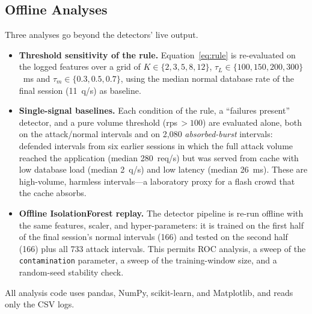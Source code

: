 \subsection{Offline Analyses}
Three analyses go beyond the detectors' live output.
\begin{itemize}[leftmargin=*]
\item \textbf{Threshold sensitivity of the rule.} Equation~\eqref{eq:rule} is
re-evaluated on the logged features over a grid of $K\in\{2,3,5,8,12\}$,
$\tau_L\in\{100,150,200,300\}$~ms and $\tau_m\in\{0.3,0.5,0.7\}$, using the median
normal database rate of the final session (11~q/s) as baseline.
\item \textbf{Single-signal baselines.} Each condition of the rule, a ``failures
present'' detector, and a pure volume threshold (rps$\,>100$) are evaluated alone, both
on the attack/normal intervals and on 2{,}080 \emph{absorbed-burst} intervals: defended
intervals from six earlier sessions in which the full attack volume reached the
application (median 280~req/s) but was served from cache with low database load
(median 2~q/s) and low latency (median 26~ms). These are high-volume, harmless
intervals---a laboratory proxy for a flash crowd that the cache absorbs.
\item \textbf{Offline IsolationForest replay.} The detector pipeline is re-run offline
with the same features, scaler, and hyper-parameters: it is trained on the first half
of the final session's normal intervals (166) and tested on the second half (166) plus
all 733 attack intervals. This permits ROC analysis, a sweep of the
\texttt{contamination} parameter, a sweep of the training-window size, and a
random-seed stability check.
\end{itemize}
All analysis code uses pandas, NumPy, scikit-learn, and Matplotlib, and reads only the
CSV logs.
